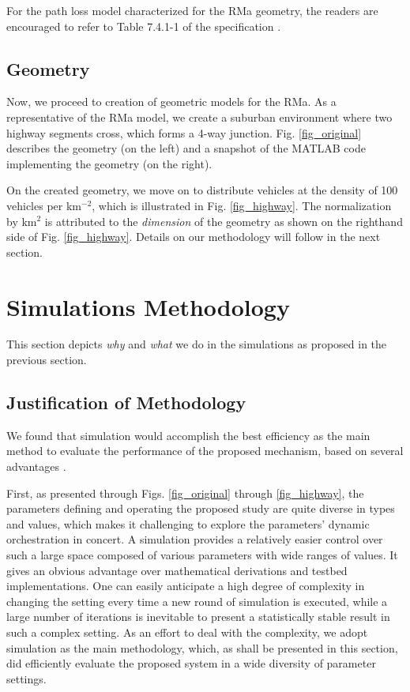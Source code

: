 \documentclass[journal]{IEEEtran}
\begin{document}
For the path loss model characterized for the RMa geometry, the readers are encouraged to refer to Table 7.4.1-1 of the specification \cite{tr38901}.


\subsection{Geometry}
Now, we proceed to creation of geometric models for the RMa. As a representative of the RMa model, we create a suburban environment where two highway segments cross, which forms a 4-way junction. Fig. \ref{fig_original} describes the geometry (on the left) and a snapshot of the MATLAB code implementing the geometry (on the right).

On the created geometry, we move on to distribute vehicles at the density of 100 vehicles per km$^{-2}$, which is illustrated in Fig. \ref{fig_highway}. The normalization by km$^{2}$ is attributed to the \textit{dimension} of the geometry as shown on the righthand side of Fig. \ref{fig_highway}. Details on our methodology will follow in the next section.



\section{Simulations Methodology}
This section depicts \textit{why} and \textit{what} we do in the simulations as proposed in the previous section.

\subsection{Justification of Methodology}
We found that simulation would accomplish the best efficiency as the main method to evaluate the performance of the proposed mechanism, based on several advantages \cite{ibrahim20}.

First, as presented through Figs. \ref{fig_original} through \ref{fig_highway}, the parameters defining and operating the proposed study are quite diverse in types and values, which makes it challenging to explore the parameters' dynamic orchestration in concert. A simulation provides a relatively easier control over such a large space composed of various parameters with wide ranges of values. It gives an obvious advantage over mathematical derivations and testbed implementations. One can easily anticipate a high degree of complexity in changing the setting every time a new round of simulation is executed, while a large number of iterations is inevitable to present a statistically stable result in such a complex setting. As an effort to deal with the complexity, we adopt simulation as the main methodology, which, as shall be presented in this section, did efficiently evaluate the proposed system in a wide diversity of parameter settings.
\end{document}
